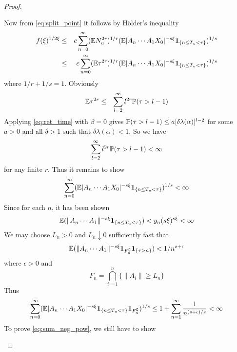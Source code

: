 \documentclass{article}
\theoremstyle{remark}
\begin{document}
\begin{proof}
\begin{enumerate}
    Now from \eqref{eq:split_point} it follows by H\"older's inequality
    \begin{eqnarray*}
      f(\xi)^{1/2\xi}
      &\leq&
      c \sum_{n=0}^\infty
      (\E N_u^{2r})^{1/r}
      (\E |A_n \cdots A_1 X_0|^{-s\xi}\1{n \leq T_u < \tau})^{1/s} \\
      &\leq&
      c \sum_{n=0}^\infty
      (\E\tau^{2r})^{1/r}
      (\E |A_n \cdots A_1 X_0|^{-s\xi}\1{n \leq T_u < \tau})^{1/s}
    \end{eqnarray*}
    where $1/r + 1/s = 1$. Obviously
    \begin{eqnarray*}
      \E \tau^{2r}
      &\leq&
      \sum_{l=2}^\infty l^{2r} \P(\tau > l-1)
    \end{eqnarray*}
    Applying \eqref{eq:ret_time} with $\beta = 0$ gives $\P(\tau >
    l-1) \leq a [\delta \lambda(\alpha)]^{l-2}$ for some $a > 0$ and
    all $\delta > 1$ such that $\delta \lambda(\alpha) < 1$. So we
    have
    \begin{eqnarray*}
      \sum_{l=2}^\infty l^{2r} \P(\tau > l-1) < \infty
    \end{eqnarray*}
    for any finite $r$. Thus it remains to show
    \begin{equation}
      \label{eq:sum_neg_pow}
      \sum_{n=0}^\infty
      (\E |A_n \cdots A_1 X_0|^{-s\xi}\1{n \leq T_u < \tau})^{1/s}
      < \infty
    \end{equation}
    Since for each $n$, it has been shown
    \begin{equation*}
      \E (\|A_n \cdots A_1\|^{-s\xi}\1{n \leq T_u < \tau})
      < y_n(s\xi)^{s\xi} < \infty
    \end{equation*}
    We may choose $L_n > 0$ and $L_n \downarrow 0$ sufficiently fast that
    \begin{equation*}
      \E (
      \|A_n \cdots A_1\|^{-s\xi}
      \I_{F_n^\complement}
      \1{\tau > n} 
      ) < {1 / n^{s+\epsilon}}
    \end{equation*}
    where $\epsilon > 0$ and
    \begin{equation*}
      F_n = \bigcap_{i=1}^n \{\|A_i\| \geq L_n\}
    \end{equation*}
    Thus
    \begin{equation*}
      \sum_{n=0}^\infty
      (\E |A_n \cdots A_1 X_0|^{-s\xi}\1{n \leq T_u < \tau}
      \I_{F_n^\complement})^{1/s}
      \leq
      1 + 
      \sum_{n=1}^\infty {1 \over n^{(s + \epsilon)/s}} < \infty
    \end{equation*}
    To prove \eqref{eq:sum_neg_pow}, we still have to show

\end{enumerate}
\end{proof}
\end{document}
